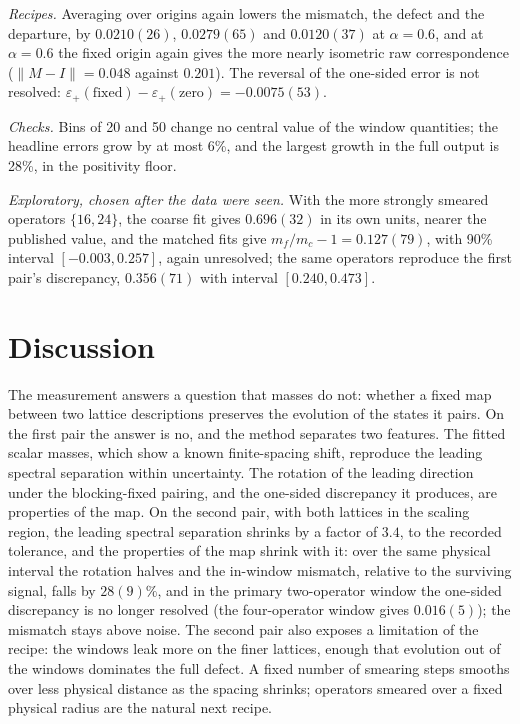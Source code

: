 \documentclass[11pt]{article}
\newcommand{\eps}{\varepsilon}
\begin{document}
\emph{Recipes.} Averaging over origins again lowers the mismatch, the defect and the departure, by
$0.0210(26)$, $0.0279(65)$ and $0.0120(37)$ at $\alpha=0.6$, and at $\alpha=0.6$ the fixed origin again gives
the more nearly isometric raw correspondence ($\|M-I\|=0.048$ against $0.201$). The reversal of the
one-sided error is not resolved: $\eps_+(\text{fixed})-\eps_+(\text{zero})=-0.0075(53)$.

\emph{Checks.} Bins of 20 and 50 change no central value of the window quantities; the headline errors
grow by at most 6\%, and
the largest growth in the full output is 28\%, in the positivity floor.

\emph{Exploratory, chosen after the data were seen.} With the more strongly smeared operators $\{16,24\}$,
the coarse fit gives $0.696(32)$ in its own units, nearer the published value, and the matched fits give
$m_f/m_c-1=0.127(79)$, with 90\% interval $[-0.003,0.257]$, again unresolved; the same operators reproduce
the first pair's discrepancy, $0.356(71)$ with interval $[0.240,0.473]$.

\section{Discussion}

The measurement answers a question that masses do not: whether a fixed map between two lattice
descriptions preserves the evolution of the states it pairs. On the first pair the answer is no, and the
method separates two features. The fitted scalar masses, which show a known finite-spacing shift,
reproduce the leading spectral separation within uncertainty. The rotation of the leading direction under the blocking-fixed pairing, and the
one-sided discrepancy it produces, are properties of the map. On the second pair, with both lattices in
the scaling region, the leading spectral separation shrinks by a factor of $3.4$, to the recorded
tolerance, and the properties of the map shrink with it: over the same physical interval the rotation
halves and the in-window mismatch, relative to the surviving signal, falls by $28(9)\%$, and in the primary
two-operator window the one-sided discrepancy is no longer resolved (the four-operator window gives
$0.016(5)$); the mismatch stays above noise. The second pair also exposes a limitation of the recipe: the
windows leak more on the finer lattices, enough that evolution out of the windows dominates the full
defect. A fixed number of smearing steps smooths
over less physical distance as the spacing shrinks; operators smeared over a fixed physical radius are
the natural next recipe.
\end{document}
